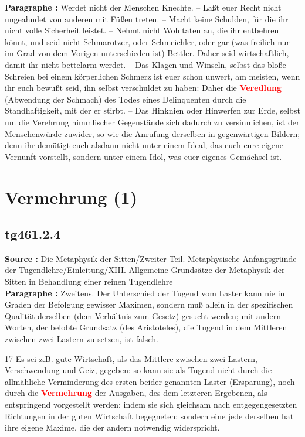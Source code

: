 \documentclass[a4paper,12pt,twoside]{book}
\newcommand{\match}[1]{\textcolor{red}{\textbf{#1}}}
\newcommand{\unnumberedsection}[1]{
	\section*{#1}
	\addcontentsline{toc}{section}{#1}
	\markright{#1}
}
\begin{document}
	\textbf{Paragraphe : }Werdet nicht der Menschen Knechte. – Laßt euer Recht nicht ungeahndet von anderen mit Füßen treten. – Macht keine Schulden, für die ihr nicht volle Sicherheit leistet. – Nehmt nicht Wohltaten an, die ihr entbehren könnt, und seid nicht Schmarotzer, oder Schmeichler, oder gar (was freilich nur im Grad von dem Vorigen unterschieden ist) Bettler. Daher seid wirtschaftlich, damit ihr nicht bettelarm werdet. – Das Klagen und Winseln, selbst das bloße Schreien bei einem körperlichen Schmerz ist euer schon unwert, am meisten, wenn ihr euch bewußt seid, ihn selbst verschuldet zu haben: Daher die \match{Veredlung} (Abwendung der Schmach) des Todes eines Delinquenten durch die Standhaftigkeit, mit der er stirbt. – Das Hinknien oder Hinwerfen zur Erde, selbst um die Verehrung himmlischer Gegenstände sich dadurch zu versinnlichen, ist der Menschenwürde zuwider, so wie die Anrufung derselben in gegenwärtigen Bildern; denn ihr demütigt euch alsdann nicht unter einem Ideal, das euch eure eigene Vernunft vorstellt, sondern unter einem Idol, was euer eigenes Gemächsel ist. 
	
	\unnumberedsection{Vermehrung (1)} 
	\subsection*{tg461.2.4} 
	\textbf{Source : }Die Metaphysik der Sitten/Zweiter Teil. Metaphysische Anfangsgründe der Tugendlehre/Einleitung/XIII. Allgemeine Grundsätze der Metaphysik der Sitten in Behandlung einer reinen Tugendlehre\\  
	
	\textbf{Paragraphe : }
	Zweitens. Der Unterschied der Tugend vom Laster kann nie in Graden der Befolgung gewisser Maximen, sondern muß allein in der spezifischen Qualität derselben (dem Verhältnis zum Gesetz) gesucht werden; mit andern Worten, der belobte Grundsatz (des Aristoteles), die Tugend in dem Mittleren zwischen zwei Lastern zu setzen, ist falsch.
	
	
	17
	Es sei z.B. gute Wirtschaft, als das Mittlere
	zwischen zwei Lastern, Verschwendung und Geiz, gegeben: so kann sie als Tugend nicht durch die allmähliche Verminderung des ersten beider genannten Laster (Ersparung), noch durch die \match{Vermehrung} der Ausgaben, des dem letzteren Ergebenen, als entspringend vorgestellt werden: indem sie sich gleichsam nach entgegengesetzten Richtungen in der guten Wirtschaft begegneten: sondern eine jede derselben hat ihre eigene Maxime, die der andern notwendig widerspricht. 
	
\end{document}
